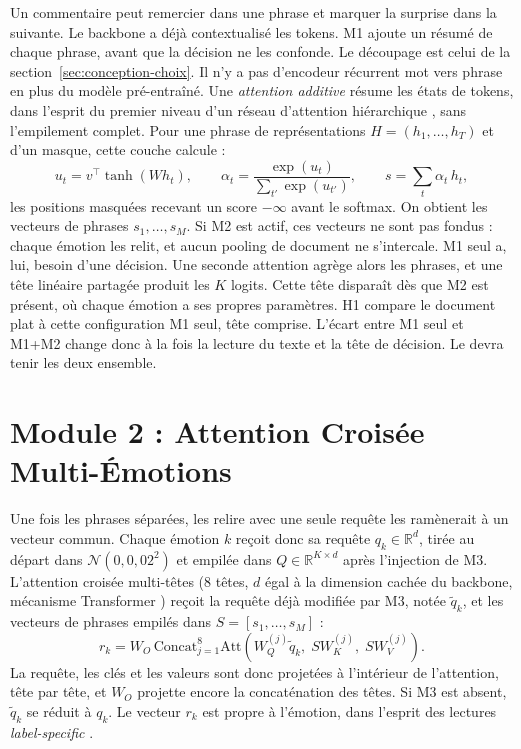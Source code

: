 Un commentaire peut remercier dans une phrase et marquer la surprise
dans la suivante. Le backbone a déjà contextualisé les tokens. M1 ajoute
un résumé de chaque phrase, avant que la décision ne les confonde. Le
découpage est celui de la section~\ref{sec:conception-choix}. Il n'y a
pas d'encodeur récurrent mot vers phrase en plus du modèle
pré-entraîné. Une \emph{attention additive} \cite{bahdanau2015} résume
les états de tokens, dans l'esprit du premier niveau d'un réseau
d'attention hiérarchique \cite{yang2016}, sans l'empilement complet.
Pour une phrase de représentations $H=(h_1,\dots,h_T)$ et d'un masque,
cette couche calcule :
\begin{equation}
u_t = v^\top \tanh(W h_t), \qquad
\alpha_t = \frac{\exp(u_t)}{\sum_{t'} \exp(u_{t'})}, \qquad
s = \sum_t \alpha_t\, h_t,
\label{eq:attnpool}
\end{equation}
les positions masquées recevant un score $-\infty$ avant le softmax.
On obtient les vecteurs de phrases $s_1,\dots,s_M$. Si M2 est actif, ces
vecteurs ne sont pas fondus : chaque émotion les relit, et aucun pooling
de document ne s'intercale. M1 seul a, lui, besoin d'une décision. Une
seconde attention agrège alors les phrases, et une tête linéaire
partagée produit les $K$ logits. Cette tête disparaît dès que M2 est
présent, où chaque émotion a ses propres paramètres. H1 compare le
document plat à cette configuration M1 seul, tête comprise. L'écart entre
M1 seul et M1+M2 change donc à la fois la lecture du texte et la tête de
décision. Le  devra tenir les deux ensemble.

\section{Module 2 : Attention Croisée Multi-Émotions}
\label{sec:conception-m2}

Une fois les phrases séparées, les relire avec une seule requête les
ramènerait à un vecteur commun. Chaque émotion $k$ reçoit donc sa
requête $q_k \in \mathbb{R}^d$, tirée au départ dans
$\mathcal{N}(0, 0{,}02^2)$ et empilée dans
$Q \in \mathbb{R}^{K \times d}$ après l'injection de M3. L'attention
croisée multi-têtes ($8$ têtes, $d$ égal à la dimension cachée du
backbone, mécanisme Transformer \cite{vaswani2017}) reçoit la requête
déjà modifiée par M3, notée $\tilde{q}_k$, et les vecteurs de phrases
empilés dans $S = [s_1,\dots,s_M]$ :
\begin{equation}
r_k = W_O\, \mathrm{Concat}_{j=1}^{8}
\mathrm{Att}\!\left(
W_Q^{(j)}\tilde{q}_k,\; S W_K^{(j)},\; S W_V^{(j)}
\right).
\label{eq:mha}
\end{equation}
La requête, les clés et les valeurs sont donc projetées à l'intérieur de
l'attention, tête par tête, et $W_O$ projette encore la concaténation des
têtes. Si M3 est absent, $\tilde{q}_k$ se réduit à $q_k$. Le vecteur
$r_k$ est propre à l'émotion, dans l'esprit des lectures
\emph{label-specific} \cite{mullenbach2018}.

